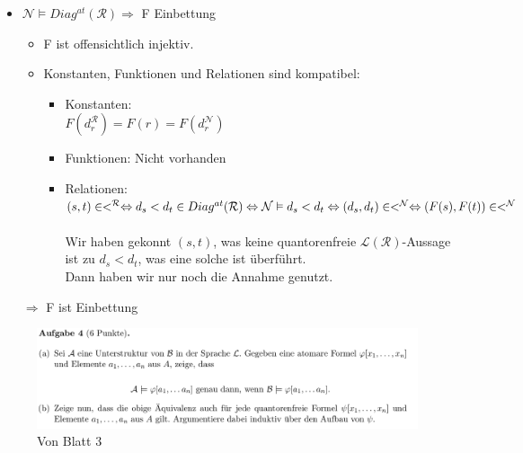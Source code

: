 \documentclass[a4paper]{scrartcl}
\begin{document}
\begin{itemize}
\begin{itemize}
                \item $\mathcal{N} \vDash Diag^{at}(\mathcal{R}) \Rightarrow$ F Einbettung\\
                    \begin{itemize}
                        \item F ist offensichtlich injektiv.\\
                        \item Konstanten, Funktionen und Relationen sind kompatibel:\\
                            \begin{itemize}
                                \item Konstanten:\\
                                    $F(d_r^{\mathcal{R}}) = F(r) = F(d_r^{\mathcal{N}})$\\
                                \item Funktionen: Nicht vorhanden\\
                                \item Relationen:\\
                                    $(s,t) \in <^\mathcal{R} \Leftrightarrow d_s < d_t \in Diag^{at}(\mathcal{R})\\
                                    \Leftrightarrow \mathcal{N} \vDash d_s < d_t
                                    \Leftrightarrow (d_s,d_t) \in <^\mathcal{N} \Leftrightarrow (F(s),F(t)) \in <^\mathcal{N}$\\
                                    \\Wir haben gekonnt $(s,t)$, was keine quantorenfreie $\mathscr{L}(\mathcal{R})$-Aussage ist zu $d_s < d_t$, 
                                    was eine solche ist überführt.\\
                                    Dann haben wir nur noch die Annahme genutzt.\\
                            \end{itemize}
                    \end{itemize} 
                    $\Rightarrow$ F ist Einbettung
            \end{itemize}

            \begin{figure}[H]
                \centering
                \includegraphics[scale=0.3]{./B3-4-b.png}
                \caption{Von Blatt 3}
                \label{fig:./B3-4-b}
            \end{figure}
        

\end{itemize}
\end{document}
